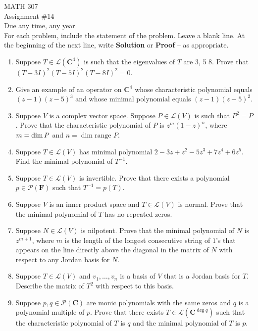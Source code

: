 \documentclass[12pt]{article}
\begin{document}
\noindent MATH 307 \\
Assignment \#14 \\
Due any time, any year \\

For each problem, include the statement of the problem. Leave a blank line.  At the beginning of the next line, write \textbf{Solution} or \textbf{Proof} -- as appropriate.

\begin{enumerate}
\item Suppose $T \in \mathcal{L}(\mathbf{C}^4)$ is such that the eigenvalues of $T$ are 3, 5 8.  Prove that $(T-3I)^2 (T-5I)^2 (T-8I)^2 = 0$.

\item Give an example of an operator on $\mathbf{C}^4$ whose characteristic polynomial equals \\ $(z-1)(z-5)^3$ and whose minimal polynomial equals $(z-1)(z-5)^2$.

\item Suppose $V$ is a complex vector space.  Suppose $P \in \mathcal{L}(V)$ is such that $P^2=P$.  Prove that the characteristic polynomial of $P$ is $z^m(1-z)^n$, where $m = \dim \null P$ and $n = \dim \text{range }P$.

\item Suppose $T \in \mathcal{L}(V)$ has minimal polynomial $2-3z+z^2-5z^3+7z^4+6z^5$. Find the minimal polynomial of $T^{-1}$.

\item Suppose $T \in \mathcal{L}(V)$ is invertible. Prove that there exists a polynomial $p \in \mathcal{P}(\mathbf{F})$ such that $T^{-1} = p(T)$.

\item Suppose $V$ is an inner product space and $T \in \mathcal{L}(V)$ is normal. Prove that the minimal polynomial of $T$ has no repeated zeros.

\item Suppose $N \in \mathcal{L}(V)$ is nilpotent. Prove that the minimal polynomial of $N$ is $z^{m+1}$, where $m$ is the length of the longest consecutive string of $1$’s that appears on the line directly above the diagonal in the matrix of $N$ with respect to any Jordan basis for $N$.

\item Suppose $T \in \mathcal{L}(V)$ and $v_1 , \ldots , v_n$ is a basis of $V$ that is a Jordan basis for $T$. Describe the matrix of $T^2$ with respect to this basis.

\item Suppose $p , q \in \mathcal{P}(\mathbf{C})$ are monic polynomials with the same zeros and $q$ is a polynomial multiple of $p$. Prove that there exists $T \in \mathcal{L}(\mathbf{C}^{\deg q})$ such that the characteristic polynomial of $T$ is $q$ and the minimal polynomial of $T$ is $p$.

\end{enumerate}
\end{document}
